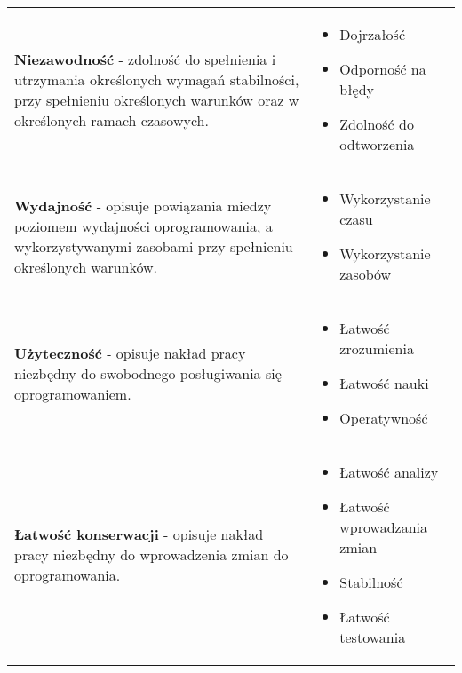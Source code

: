 \documentclass[a4paper]{article}
\begin{document}
    \begin{table}[H]
        \begin{center}
            \begin{tabular}{  p{8cm} p{8cm} }
                \textbf{Niezawodność} - zdolność do spełnienia i utrzymania
                określonych wymagań stabilności, przy spełnieniu określonych
                warunków oraz w określonych ramach czasowych.
                &
                \begin{itemize}
                    \item Dojrzałość
                    \item Odporność na błędy
                    \item Zdolność do odtworzenia
                \end{itemize}
                \\

                \cmidrule(r){1-1}\cmidrule(l){2-2}

                \textbf{Wydajność} - opisuje powiązania miedzy poziomem wydajności oprogramowania, a
                wykorzystywanymi zasobami przy spełnieniu określonych warunków.
                &
                \begin{itemize}
                    \item Wykorzystanie czasu
                    \item Wykorzystanie zasobów
                \end{itemize}
                \\

                \cmidrule(r){1-1}\cmidrule(l){2-2}

                \textbf{Użyteczność} - opisuje nakład pracy niezbędny do swobodnego posługiwania się oprogramowaniem.
                &
                \begin{itemize}
                    \item Łatwość zrozumienia
                    \item Łatwość nauki
                    \item Operatywność
                \end{itemize}
                \\

                \cmidrule(r){1-1}\cmidrule(l){2-2}

                \textbf{Łatwość konserwacji} - opisuje nakład pracy niezbędny do wprowadzenia zmian do oprogramowania.
                &
                \begin{itemize}
                    \item Łatwość analizy
                    \item Łatwość wprowadzania zmian
                    \item Stabilność
                    \item Łatwość testowania
                \end{itemize}
                \\


\end{tabular}
\end{center}
\end{table}
\end{document}
